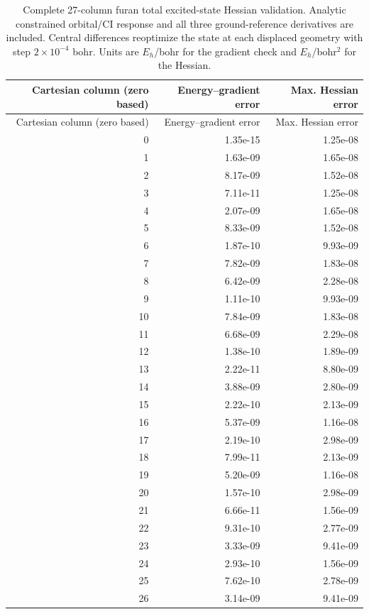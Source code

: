 \begin{longtable}{rrr}
\caption{Complete 27-column furan total excited-state Hessian validation. Analytic constrained orbital/CI response and all three ground-reference derivatives are included. Central differences reoptimize the state at each displaced geometry with step $2\times10^{-4}$ bohr. Units are $E_h$/bohr for the gradient check and $E_h$/bohr$^2$ for the Hessian.}\label{tab:furancolumns}\\
\toprule
Cartesian column (zero based) & Energy--gradient error & Max. Hessian error \\
\midrule\endfirsthead
\toprule
Cartesian column (zero based) & Energy--gradient error & Max. Hessian error \\
\midrule\endhead
0 & 1.35e-15 & 1.25e-08 \\
1 & 1.63e-09 & 1.65e-08 \\
2 & 8.17e-09 & 1.52e-08 \\
3 & 7.11e-11 & 1.25e-08 \\
4 & 2.07e-09 & 1.65e-08 \\
5 & 8.33e-09 & 1.52e-08 \\
6 & 1.87e-10 & 9.93e-09 \\
7 & 7.82e-09 & 1.83e-08 \\
8 & 6.42e-09 & 2.28e-08 \\
9 & 1.11e-10 & 9.93e-09 \\
10 & 7.84e-09 & 1.83e-08 \\
11 & 6.68e-09 & 2.29e-08 \\
12 & 1.38e-10 & 1.89e-09 \\
13 & 2.22e-11 & 8.80e-09 \\
14 & 3.88e-09 & 2.80e-09 \\
15 & 2.22e-10 & 2.13e-09 \\
16 & 5.37e-09 & 1.16e-08 \\
17 & 2.19e-10 & 2.98e-09 \\
18 & 7.99e-11 & 2.13e-09 \\
19 & 5.20e-09 & 1.16e-08 \\
20 & 1.57e-10 & 2.98e-09 \\
21 & 6.66e-11 & 1.56e-09 \\
22 & 9.31e-10 & 2.77e-09 \\
23 & 3.33e-09 & 9.41e-09 \\
24 & 2.93e-10 & 1.56e-09 \\
25 & 7.62e-10 & 2.78e-09 \\
26 & 3.14e-09 & 9.41e-09 \\
\bottomrule
\end{longtable}
